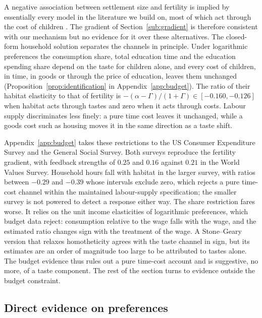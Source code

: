 \documentclass[11pt]{article}
\begin{document}
A negative association between settlement size and fertility is implied by essentially every model in
the literature we build on, most of which act through the cost of children \citep{DAO2013442,dao25}. The
gradient of Section~\ref{sub:gradient} is therefore consistent with our mechanism but no evidence for it
over these alternatives. The closed-form household solution separates the channels in principle. Under
logarithmic preferences the consumption share, total education time and the education spending share
depend on the taste for children alone, and every cost of children, in time, in goods or through the
price of education, leaves them unchanged (Proposition~\ref{prop:identification} in
Appendix~\ref{app:budget}). The ratio of their habitat elasticity to that of fertility is
$-(\alpha-\Gamma)/(1+\Gamma)\in[-0.160,-0.126]$ when habitat acts through tastes and zero when it acts
through costs. Labour supply discriminates less finely: a pure time cost leaves it unchanged, while a
goods cost such as housing moves it in the same direction as a taste shift.

Appendix~\ref{app:budget} takes these restrictions to the US Consumer Expenditure Survey and the General
Social Survey. Both surveys reproduce the fertility gradient, with feedback strengths of $0.25$ and
$0.16$ against $0.21$ in the World Values Survey. Household hours fall with habitat in the larger survey,
with ratios between $-0.29$ and $-0.39$ whose intervals exclude zero, which rejects a pure time-cost
channel within the maintained labour-supply specification; the smaller survey is not powered to detect
a response either way. The share restriction fares worse. It relies on the unit income elasticities of
logarithmic preferences, which budget data reject: consumption relative to the wage falls with the wage,
and the estimated ratio changes sign with the treatment of the wage. A Stone--Geary version that relaxes
homotheticity agrees with the taste channel in sign, but its estimates are an order of magnitude too
large to be attributed to tastes alone. The budget evidence thus rules out a pure time-cost account and
is suggestive, no more, of a taste component. The rest of the section turns to evidence outside the
budget constraint.

\subsection{Direct evidence on preferences}
\label{sub:prefs}
\end{document}
